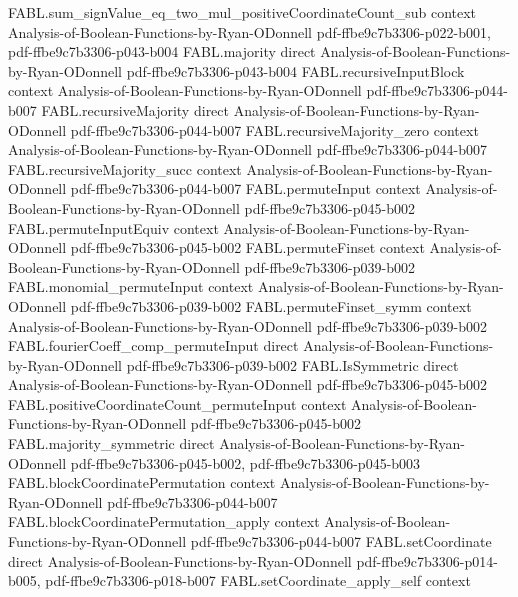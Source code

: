 \begin{theorem}
\proofstep
  {FABL.sum_signValue_eq_two_mul_positiveCoordinateCount_sub}
  {context}
  {Analysis-of-Boolean-Functions-by-Ryan-ODonnell}
  {pdf-ffbe9c7b3306-p022-b001,
    pdf-ffbe9c7b3306-p043-b004}
\proofstep
  {FABL.majority}
  {direct}
  {Analysis-of-Boolean-Functions-by-Ryan-ODonnell}
  {pdf-ffbe9c7b3306-p043-b004}
\proofstep
  {FABL.recursiveInputBlock}
  {context}
  {Analysis-of-Boolean-Functions-by-Ryan-ODonnell}
  {pdf-ffbe9c7b3306-p044-b007}
\proofstep
  {FABL.recursiveMajority}
  {direct}
  {Analysis-of-Boolean-Functions-by-Ryan-ODonnell}
  {pdf-ffbe9c7b3306-p044-b007}
\proofstep
  {FABL.recursiveMajority_zero}
  {context}
  {Analysis-of-Boolean-Functions-by-Ryan-ODonnell}
  {pdf-ffbe9c7b3306-p044-b007}
\proofstep
  {FABL.recursiveMajority_succ}
  {context}
  {Analysis-of-Boolean-Functions-by-Ryan-ODonnell}
  {pdf-ffbe9c7b3306-p044-b007}
\proofstep
  {FABL.permuteInput}
  {context}
  {Analysis-of-Boolean-Functions-by-Ryan-ODonnell}
  {pdf-ffbe9c7b3306-p045-b002}
\proofstep
  {FABL.permuteInputEquiv}
  {context}
  {Analysis-of-Boolean-Functions-by-Ryan-ODonnell}
  {pdf-ffbe9c7b3306-p045-b002}
\proofstep
  {FABL.permuteFinset}
  {context}
  {Analysis-of-Boolean-Functions-by-Ryan-ODonnell}
  {pdf-ffbe9c7b3306-p039-b002}
\proofstep
  {FABL.monomial_permuteInput}
  {context}
  {Analysis-of-Boolean-Functions-by-Ryan-ODonnell}
  {pdf-ffbe9c7b3306-p039-b002}
\proofstep
  {FABL.permuteFinset_symm}
  {context}
  {Analysis-of-Boolean-Functions-by-Ryan-ODonnell}
  {pdf-ffbe9c7b3306-p039-b002}
\proofstep
  {FABL.fourierCoeff_comp_permuteInput}
  {direct}
  {Analysis-of-Boolean-Functions-by-Ryan-ODonnell}
  {pdf-ffbe9c7b3306-p039-b002}
\proofstep
  {FABL.IsSymmetric}
  {direct}
  {Analysis-of-Boolean-Functions-by-Ryan-ODonnell}
  {pdf-ffbe9c7b3306-p045-b002}
\proofstep
  {FABL.positiveCoordinateCount_permuteInput}
  {context}
  {Analysis-of-Boolean-Functions-by-Ryan-ODonnell}
  {pdf-ffbe9c7b3306-p045-b002}
\proofstep
  {FABL.majority_symmetric}
  {direct}
  {Analysis-of-Boolean-Functions-by-Ryan-ODonnell}
  {pdf-ffbe9c7b3306-p045-b002,
    pdf-ffbe9c7b3306-p045-b003}
\proofstep
  {FABL.blockCoordinatePermutation}
  {context}
  {Analysis-of-Boolean-Functions-by-Ryan-ODonnell}
  {pdf-ffbe9c7b3306-p044-b007}
\proofstep
  {FABL.blockCoordinatePermutation_apply}
  {context}
  {Analysis-of-Boolean-Functions-by-Ryan-ODonnell}
  {pdf-ffbe9c7b3306-p044-b007}
\proofstep
  {FABL.setCoordinate}
  {direct}
  {Analysis-of-Boolean-Functions-by-Ryan-ODonnell}
  {pdf-ffbe9c7b3306-p014-b005,
    pdf-ffbe9c7b3306-p018-b007}
\proofstep
  {FABL.setCoordinate_apply_self}
  {context}

\end{theorem}
